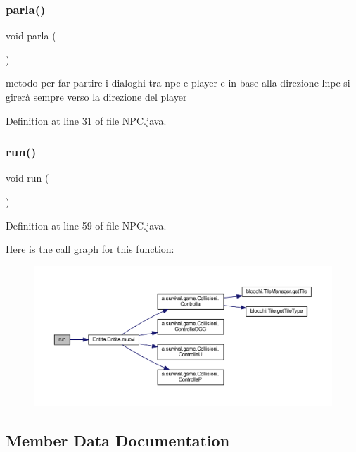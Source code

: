 \subsubsection{\texorpdfstring{parla()}{parla()}}
{\footnotesize\ttfamily void parla (\begin{DoxyParamCaption}{ }\end{DoxyParamCaption})}



metodo per far partire i dialoghi tra npc e player e in base alla direzione l\textquotesingle{}npc si girerà sempre verso la direzione del player 



Definition at line 31 of file N\+P\+C.\+java.

\mbox{\label{class_entita_1_1_n_p_c_a13a43e6d814de94978c515cb084873b1}} 
\subsubsection{\texorpdfstring{run()}{run()}}
{\footnotesize\ttfamily void run (\begin{DoxyParamCaption}{ }\end{DoxyParamCaption})}



Definition at line 59 of file N\+P\+C.\+java.

Here is the call graph for this function\+:
\nopagebreak
\begin{figure}[H]
\begin{center}
\leavevmode
\includegraphics[width=350pt]{class_entita_1_1_n_p_c_a13a43e6d814de94978c515cb084873b1_cgraph}
\end{center}
\end{figure}


\subsection{Member Data Documentation}
\mbox{\label{class_entita_1_1_n_p_c_a4fd5256973eb06099caa850f515199bb}} 
